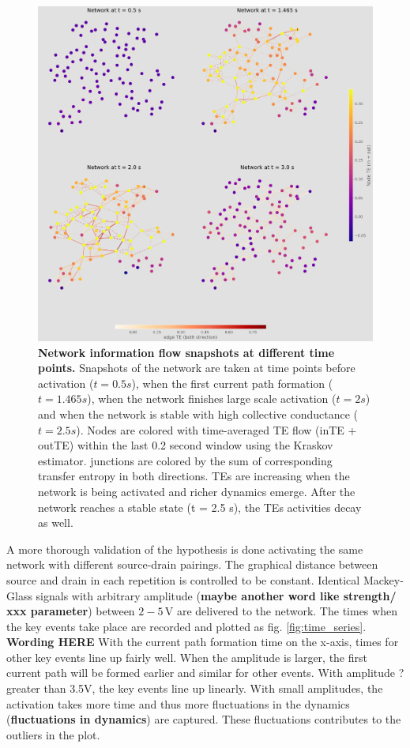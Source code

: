 \documentclass[fleqn,10pt,  reprint, amsmath,amssymb,aps, floatfix]{wlscirep}
\begin{document}
\begin{figure}[h]
	\centering
	\includegraphics[width = 0.8\paperwidth]{figure/time_network_comparison}
	\caption{\textbf{Network information flow snapshots at different time points.}
			Snapshots of the network are taken at time points before activation ($t = 0.5s$), when the first current path formation ($t=1.465s$), when the network finishes large scale activation ($t = 2s$) and when the network is stable with high collective conductance ($t = 2.5s$).
			Nodes are colored with time-averaged TE flow (inTE + outTE) within the last 0.2 second window using the Kraskov estimator. junctions are colored by the sum of corresponding transfer entropy in both directions. TEs are increasing when the network is being activated and richer dynamics emerge. After the network reaches a stable state (t = 2.5 s), the TEs activities decay as well.}
	\label{fig:network_comparison}
\end{figure}

A more thorough validation of the hypothesis is done activating the same network with different source-drain pairings. The graphical distance between source and drain in each repetition is controlled to be constant. Identical Mackey-Glass signals with arbitrary amplitude (\textbf{maybe another word like strength/ xxx parameter}) between $2-5\,$V are delivered to the network. The times when the key events take place are recorded and plotted as fig. \ref{fig:time_series}. \textbf{Wording HERE} With the current path formation time on the x-axis, times for other key events line up fairly well. When the amplitude is larger, the first current path will be formed earlier and similar for other events. With amplitude ? greater than 3.5V, the key events line up linearly. With small amplitudes, the activation takes more time and thus more fluctuations in the dynamics (\textbf{fluctuations in dynamics}) are captured. These fluctuations contributes to the outliers in the plot.
\end{document}
